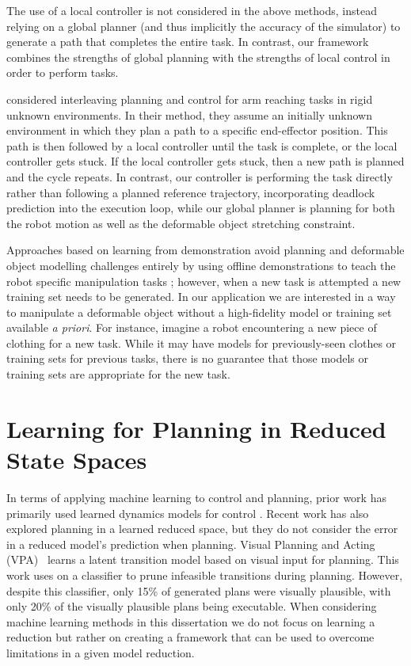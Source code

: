 The use of a local controller is not considered in the above methods, instead relying on a global planner (and thus implicitly the accuracy of the simulator) to generate a path that completes the entire task. In contrast, our framework combines the strengths of global planning with the strengths of local control in order to perform tasks.

\citet{Park2014Interleaving} considered interleaving planning and control for arm reaching tasks in rigid unknown environments. In their method, they assume an initially unknown environment in which they plan a path to a specific end-effector position. This path is then followed by a local controller until the task is complete, or the local controller gets stuck. If the local controller gets stuck, then a new path is planned and the cycle repeats. In contrast, our controller is performing the task directly rather than following a planned reference trajectory, incorporating deadlock prediction into the execution loop, while our global planner is planning for both the robot motion as well as the deformable object stretching constraint.

Approaches based on learning from demonstration avoid planning and deformable object modelling challenges entirely by using offline demonstrations to teach the robot specific manipulation tasks \cite{Huang2015, Schulman2016}; however, when a new task is attempted a new training set needs to be generated. In our application we are interested in a way to manipulate a deformable object without a high-fidelity model or training set available \textit{a priori}. For instance, imagine a robot encountering a new piece of clothing for a new task. While it may have models for previously-seen clothes or training sets for previous tasks, there is no guarantee that those models or training sets are appropriate for the new task.


\section{Learning for Planning in Reduced State Spaces}

In terms of applying machine learning to control and planning, prior work has primarily used learned dynamics models for control \cite{Finn2017, Banijamali2017, Jia2018, Zhang2019, Sutanto2019}. Recent work \cite{ichter2019} has also explored planning in a learned reduced space, but they do not consider the error in a reduced model's prediction when planning. Visual Planning and Acting (VPA)~\cite{vpa2019rss} learns a latent transition model based on visual input for planning. This work uses on a classifier to prune infeasible transitions during planning. However, despite this classifier, only 15\% of generated plans were visually plausible, with only 20\% of the visually plausible plans being executable. When considering machine learning methods in this dissertation we do not focus on learning a reduction but rather on creating a framework that can be used to overcome limitations in a given model reduction.
